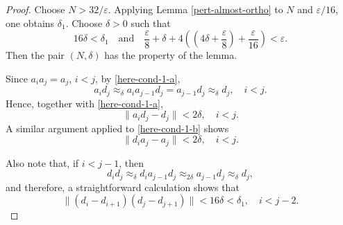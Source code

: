 \documentclass[12pt, oneside, psamsfonts]{amsart}
\theoremstyle{definition}
\theoremstyle{remark}
\numberwithin{equation}{section}
\newcommand{\norm}[1]{\| #1\|}
\newcommand{\eps}{\varepsilon}
\begin{document}
\begin{proof}
Choose $N > {32}/{\eps}.$ Applying Lemma \ref{pert-almost-ortho} to $N$ and $\eps/16$, one obtains $\delta_1$.
Choose $\delta>0$ such that
$$16\delta< \delta_1 \quad \mathrm{and} \quad \frac{\eps}{8} + \delta + 4((4\delta+\frac{\eps}{8}) + \frac{\eps}{16}) < \eps. $$
 Then the pair $(N, \delta)$ has the property of the lemma.

Since $a_i a_j = a_j$, $i < j$, by \eqref{here-cond-1-a},
$$a_i d_j \approx_\delta a_i a_{j-1} d_j = a_{j-1} d_j \approx_\delta d_j,\quad i< j. $$ Hence, together with \eqref{here-cond-1-a},
\begin{equation}\label{here-cond-1-a-eq}
\norm{a_id_j - d_j} < 2\delta,\quad  i < j.
\end{equation}
A similar argument applied to \eqref{here-cond-1-b} shows
\begin{equation}\label{here-cond-1-b-eq}
\norm{d_ia_j - a_j} < 2\delta, \quad  i < j.
\end{equation}

Also note that, if $i < j-1$, then
$$d_i d_j \approx_\delta d_i a_{j-1} d_j \approx_{2\delta} a_{j-1} d_j \approx_\delta d_j,$$
and therefore, a straightforward calculation shows that 
\begin{equation}\label{orth-cond}
\norm{(d_i-d_{i+1})(d_j - d_{j+1})} <16\delta < \delta_1 ,\quad i < j-2.
\end{equation}


\end{proof}
\end{document}
